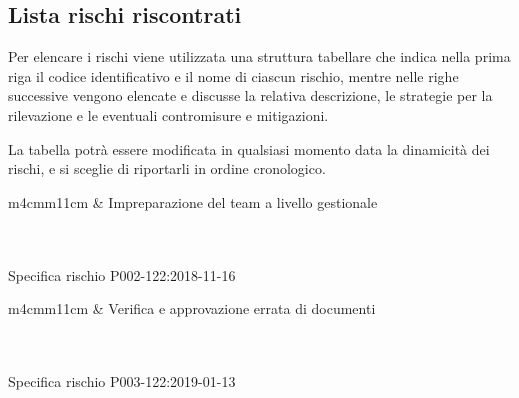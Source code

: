 	\subsection{Lista rischi riscontrati}

	Per elencare i rischi viene utilizzata una struttura tabellare che indica nella prima riga il codice identificativo e il nome di ciascun rischio,
	mentre nelle righe successive vengono elencate e discusse la relativa descrizione, le strategie per la rilevazione e le eventuali contromisure e mitigazioni.\par

	La tabella potrà essere modificata in qualsiasi momento data la dinamicità dei rischi, e si sceglie di riportarli in ordine cronologico.


	\begin{table}[H]
		\begin{risktable}{\columnwidth}{m{4cm}m{11cm}}
			 &
			Impreparazione del team a livello gestionale \\
			\rowcolor{\tablegray}
			\\
			\\
		\end{risktable}
		\caption{Specifica rischio P002-122:2018-11-16}
	\end{table}

	\mydoublerule{\linewidth}{0pt}{2pt}

	\begin{table}[H]
		\begin{risktable}{\columnwidth}{m{4cm}m{11cm}}
			 &
			Verifica e approvazione errata di documenti \\
			\rowcolor{\tablegray}
			\\
			\\
		\end{risktable}
		\caption{Specifica rischio P003-122:2019-01-13}
	\end{table}


